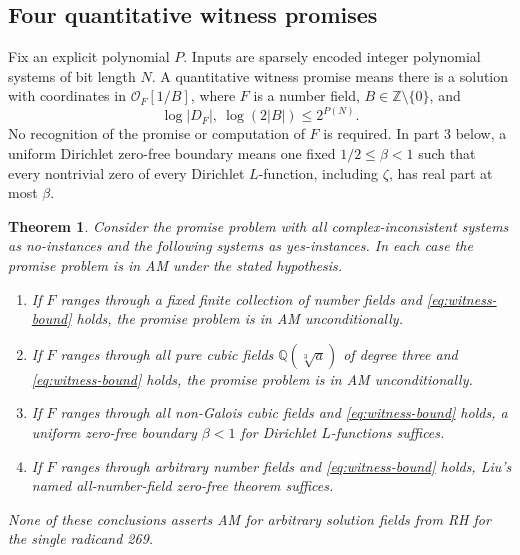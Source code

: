\documentclass[11pt]{article}
\newtheorem{theorem}{Theorem}[section]
\newcommand{\Q}{\mathbb Q}
\newcommand{\Z}{\mathbb Z}
\begin{document}
\subsection*{Four quantitative witness promises}
Fix an explicit polynomial $P$. Inputs are sparsely encoded integer
polynomial systems of bit length $N$. A quantitative witness promise
means there is a solution with coordinates in
$\mathcal O_F[1/B]$, where $F$ is a number field,
$B\in\Z\setminus\{0\}$, and
\[
 \log|D_F|,\ \log(2|B|)\le2^{P(N)}.                               \tag{1.4}\label{eq:witness-bound}
\]
No recognition of the promise or computation of $F$ is required.
In part 3 below, a uniform Dirichlet zero-free boundary means one
fixed $1/2\le\beta<1$ such that every nontrivial zero of every
Dirichlet $L$-function, including $\zeta$, has real part at most
$\beta$.

\begin{theorem}\label{thm:HN}
Consider the promise problem with all complex-inconsistent systems
as no-instances and the following systems as yes-instances.
In each case the promise problem is in AM under the stated hypothesis.
\begin{enumerate}
\item If $F$ ranges through a fixed finite collection of number
fields and \eqref{eq:witness-bound} holds, the promise problem is in AM
unconditionally.
\item If $F$ ranges through all pure cubic fields
$\Q(\sqrt[3]a)$ of degree three and \eqref{eq:witness-bound} holds, the promise
problem is in AM unconditionally.
\item If $F$ ranges through all non-Galois cubic fields and
\eqref{eq:witness-bound} holds, a uniform zero-free boundary $\beta<1$ for Dirichlet
$L$-functions suffices.
\item If $F$ ranges through arbitrary number fields and \eqref{eq:witness-bound}
holds, Liu's named all-number-field zero-free theorem suffices.
\end{enumerate}
None of these conclusions asserts AM for arbitrary solution fields from
RH for the single radicand 269.
\end{theorem}
\end{document}
